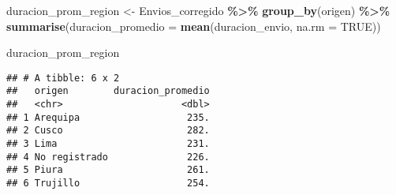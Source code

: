 \documentclass[
]{article}
\newenvironment{Shaded}{\begin{snugshade}}{\end{snugshade}}
\newcommand{\AttributeTok}[1]{\textcolor[rgb]{0.13,0.29,0.53}{#1}}
\newcommand{\ConstantTok}[1]{\textcolor[rgb]{0.56,0.35,0.01}{#1}}
\newcommand{\FunctionTok}[1]{\textcolor[rgb]{0.13,0.29,0.53}{\textbf{#1}}}
\newcommand{\NormalTok}[1]{#1}
\newcommand{\OtherTok}[1]{\textcolor[rgb]{0.56,0.35,0.01}{#1}}
\newcommand{\SpecialCharTok}[1]{\textcolor[rgb]{0.81,0.36,0.00}{\textbf{#1}}}
\begin{document}
\begin{Shaded}
\begin{Highlighting}[]
\NormalTok{duracion\_prom\_region }\OtherTok{\textless{}{-}}\NormalTok{ Envios\_corregido }\SpecialCharTok{\%\textgreater{}\%}
  \FunctionTok{group\_by}\NormalTok{(origen) }\SpecialCharTok{\%\textgreater{}\%}
  \FunctionTok{summarise}\NormalTok{(}\AttributeTok{duracion\_promedio =} \FunctionTok{mean}\NormalTok{(duracion\_envio, }\AttributeTok{na.rm =} \ConstantTok{TRUE}\NormalTok{))}

\NormalTok{duracion\_prom\_region}
\end{Highlighting}
\end{Shaded}

\begin{verbatim}
## # A tibble: 6 x 2
##   origen        duracion_promedio
##   <chr>                     <dbl>
## 1 Arequipa                   235.
## 2 Cusco                      282.
## 3 Lima                       231.
## 4 No registrado              226.
## 5 Piura                      261.
## 6 Trujillo                   254.
\end{verbatim}
\end{document}
